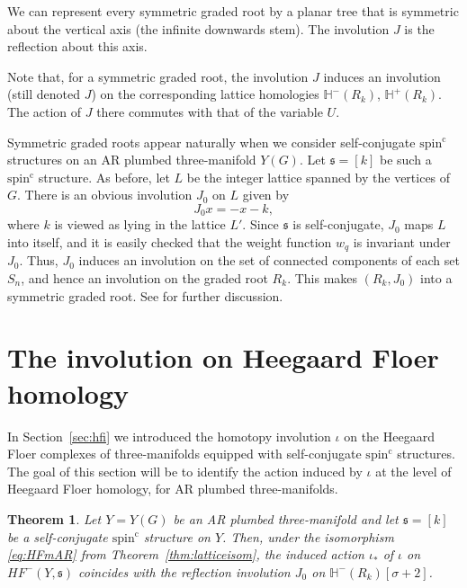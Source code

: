 \documentclass[11 pt]{amsart}
\newtheorem {theorem}{Theorem}[section]
\theoremstyle{remark}
\def\spinc {{\operatorname{spin^c}}}
\def\s{\mathfrak s}
\def\He{\mathbb{H}}
\def\HF {\mathit{HF}}
\newcommand \HFm {\HF^-}
\def\inv{\iota}
\begin{document}
We can represent every symmetric graded root by a planar tree that is symmetric about the vertical axis (the infinite downwards stem). The involution $J$ is the reflection about this axis.

Note that, for a symmetric graded root, the involution $J$ induces an involution (still denoted $J$) on the corresponding lattice homologies $\He^-(R_k)$, $\He^+(R_k)$. The action of $J$ there commutes with that of the variable $U$.
 
Symmetric graded roots appear naturally when we consider self-conjugate $\spinc$ structures on an AR plumbed three-manifold $Y(G)$. Let $\s = [k]$ be such a $\spinc$ structure. As before, let $L$ be the integer lattice spanned by the vertices of $G$. There is an obvious involution $J_0$ on $L$ given by
$$ J_0x = -x - k, $$
where $k$ is viewed as lying in the lattice $L'$. Since $\s$ is self-conjugate, $J_0$ maps $L$ into itself, and it is easily checked that the weight function $w_q$ is invariant under $J_0$. Thus, $J_0$ induces an involution on the set of connected components of each set $S_n$, and hence an involution on the graded root $R_k$. This makes $(R_k, J_0)$ into a symmetric graded root. See \cite[Section 2.1]{Dai} for further discussion.
 



\section{The involution on Heegaard Floer homology}
\label{sec:J}
In Section~\ref{sec:hfi} we introduced the homotopy involution $\inv$ on the Heegaard Floer complexes of three-manifolds equipped with self-conjugate $\spinc$ structures. The goal of this section will be to identify the action induced by $\inv$ at the level of Heegaard Floer homology, for AR plumbed three-manifolds.

\begin{theorem}
\label{thm:Jequiv}
Let $Y = Y(G)$ be an AR plumbed three-manifold and let $\s = [k]$ be a self-conjugate $\spinc$ structure on $Y$. Then, under the isomorphism \eqref{eq:HFmAR} from Theorem~\ref{thm:latticeisom}, the induced action $\inv_*$ of $\inv$ on $\HFm(Y, \s)$ coincides with the reflection involution $J_0$ on $\He^-(R_k)[\sigma+2]$. 
\end{theorem}
\end{document}
